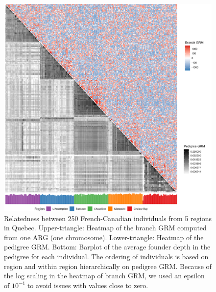 \begin{figure}
    \centering
    \includegraphics[width=\textwidth]{Figures/Fig4_grm_prm_heatmaps4.jpg}
    \caption{Relatedness between 250 French-Canadian individuals from 5 regions in Quebec.
      Upper-triangle: Heatmap of the branch GRM computed from one ARG (one chromosome).
      Lower-triangle: Heatmap of the pedigree GRM. 
      Bottom: Barplot of the average founder depth in the pedigree for each individual.
      The ordering of individuals is based on region and within region hierarchically on pedigree GRM.
      Because of the log scaling in the heatmap of branch GRM, we used an epsilon of $10^{-4}$ to avoid issues with values close to zero.
    }
    \label{fig:grm_heatmap}
\end{figure}


